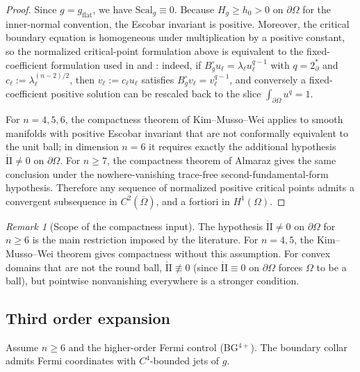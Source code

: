 \documentclass[11pt,reqno,a4paper]{amsart}
\numberwithin{equation}{section}
\theoremstyle{plain}
\newcommand{\Scal}{\mathrm{Scal}}
\theoremstyle{remark}
\newtheorem{remark}[theorem]{Remark}
\theoremstyle{plain}
\begin{document}
\begin{proof}
Since $g=g_{\mathrm{flat}}$, we have $\Scal_g\equiv0$. Because $H_g\ge h_0>0$ on
$\partial\Omega$ for the inner-normal convention, the Escobar invariant is positive.
Moreover, the critical boundary equation is homogeneous under multiplication by a
positive constant, so the normalized critical-point formulation above is equivalent to
the fixed-coefficient formulation used in \cite[Theorem~1.2]{Almaraz2011CVPDE} and
\cite[Theorem~1.1]{KimMussoWei2021}: indeed, if
$B_g^\circ u_\ell=\lambda_\ell u_\ell^{q-1}$ with $q=2^*_{\partial}$ and
$c_\ell:=\lambda_\ell^{(n-2)/2}$, then $v_\ell:=c_\ell u_\ell$ satisfies
$B_g^\circ v_\ell=v_\ell^{q-1}$, and conversely a fixed-coefficient positive solution
can be rescaled back to the slice $\int_{\partial\Omega}u^q=1$.

For $n=4,5,6$, the compactness theorem of Kim--Musso--Wei
\cite[Theorem~1.1]{KimMussoWei2021} applies to smooth manifolds with positive
Escobar invariant that are not conformally equivalent to the unit ball; in dimension
$n=6$ it requires exactly the additional hypothesis $\mathring{\mathrm{II}}\neq0$ on $\partial\Omega$.
For $n\ge7$, the compactness theorem of Almaraz
\cite[Theorem~1.2]{Almaraz2011CVPDE} gives the same conclusion under the
nowhere-vanishing trace-free second-fundamental-form hypothesis. Therefore any
sequence of normalized positive critical points admits a convergent subsequence in
$C^2(\overline\Omega)$, and a fortiori in $H^1(\Omega)$.
\end{proof}

\begin{remark}[Scope of the compactness input]\label{rem:convex-compactness-scope}
The hypothesis $\mathring{\mathrm{II}}\neq0$ on $\partial\Omega$ for $n\ge6$
is the main restriction imposed by the literature.
For $n=4,5$, the Kim--Musso--Wei theorem gives compactness without this assumption.
For convex domains that are not the round ball, $\mathring{\mathrm{II}}\not\equiv0$
(since $\mathring{\mathrm{II}}\equiv0$ on $\partial\Omega$ forces $\Omega$ to be
a ball), but pointwise nonvanishing everywhere is a stronger condition.
\end{remark}


\subsection{Third order expansion}
Assume $n\ge6$ and the higher-order Fermi control
\textup{(BG$^{4+}$)}. The boundary collar admits Fermi coordinates with $C^4$-bounded jets of $g$.
\end{document}
